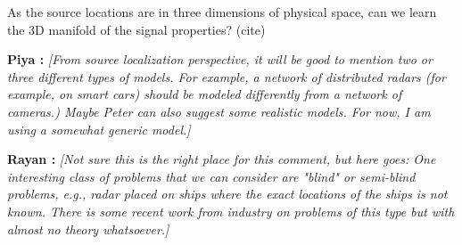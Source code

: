 \documentclass{article}
\newcommand{\comment}[3]{{\color{#1} {\bf #2 :} #3}}
\newcommand{\piya}[1]{\comment{blue}{Piya}{#1}}
\newcommand{\rayan}[1]{\comment{red}{Rayan}{#1}}
\begin{document}
As the source locations are in three dimensions of physical space, can we learn the 3D manifold of the signal properties? (cite)


\piya{\em [From source localization perspective, it will be good to mention two or three different types of models. For example, a network of distributed radars (for example, on smart cars) should be modeled differently from a network of cameras.) Maybe Peter can also suggest some realistic models. For now, I am using a somewhat generic model.]}

\rayan{\em [Not sure this is the right place for this comment, but here goes: One interesting class of problems that we can consider are "blind" or semi-blind problems, e.g., radar placed on ships where the exact locations of the ships is not known. There is some recent work from industry on problems of this type but with almost no theory whatsoever.]}
\end{document}
